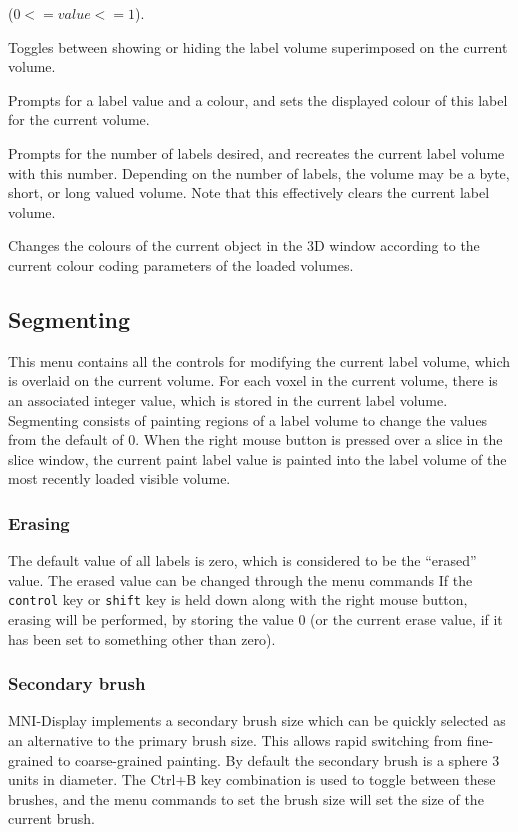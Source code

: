 \documentclass[11pt,letterpaper]{article}
\newcommand{\ident}[1]{{\tt #1}}
\newcommand{\display}{\mbox{MNI-Display}}
\newcommand{\menutwo}[2]{{\scriptsize \fbox{\bf #1}/\fbox{\bf #2}}}
\begin{document}
\begin{description}
  ($0 <= value <= 1$).
\item[\menutwo{Colour Coding}{Show Labels}]  Toggles between showing
  or hiding the label volume superimposed on the current
  volume.
\item[\menutwo{Colour Coding}{Set Paint Lbl Colour}]  Prompts for a
  label value and a colour, and sets the displayed
  colour of this label for the current volume.
\item[\menutwo{Colour Coding}{Num Labels}] Prompts for the number of
  labels desired, and recreates the current label volume with this
  number.  Depending on the number of labels, the volume may be a
  byte, short, or long valued volume.  Note that this effectively
  clears the current label volume.
\item[\menutwo{Colour Coding}{Colour Code Objects}]  Changes the
  colours of the current object in the 3D window according to the current
  colour coding parameters of the loaded volumes.
\end{description}

\subsection{Segmenting}

This menu contains all the controls for modifying the current label
volume, which is overlaid on the current volume. For each voxel in the
current volume, there is an associated integer value, which is stored in
the current label volume. Segmenting consists of painting regions of a
label volume to change the values from the default of 0.  When the right
mouse button is pressed over a slice in the slice window, the current
paint label value is painted into the label volume of the most recently
loaded visible volume.  

\subsubsection{Erasing}

The default value of all labels is zero, which is considered to be the
``erased'' value. The erased value can be changed through the menu
commands If the \ident{control} key or \ident{shift}
key is held down along with the right mouse button, erasing will be
performed, by storing the value 0 (or the current erase value, if it has
been set to something other than zero).

\subsubsection{Secondary brush}
\display{} implements a secondary brush size which can be quickly
selected as an alternative to the primary brush size. This allows rapid
switching from fine-grained to coarse-grained painting. By default the
secondary brush is a sphere 3 units in diameter. The Ctrl+B key combination
is used to toggle between these brushes, and the menu commands to set
the brush size will set the size of the current brush.
\end{document}
